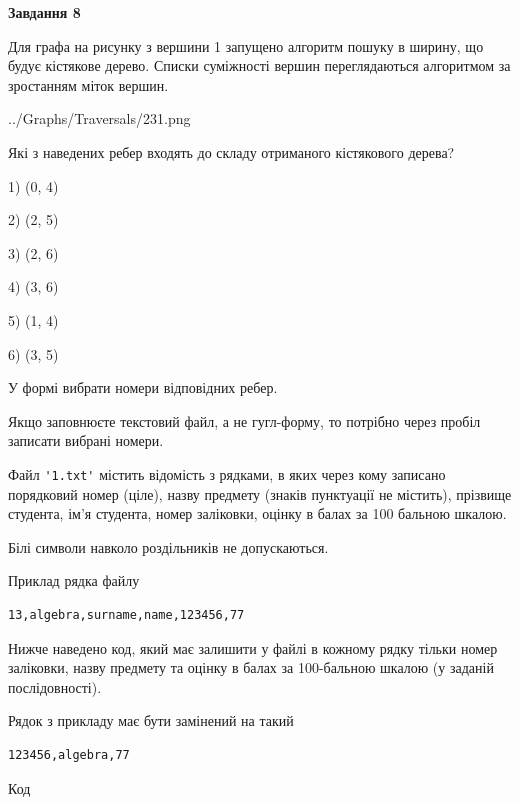 \documentclass[12pt, ukrainian]{article}
\def\code#1{\Verb!#1!}
\begin{document}
{\begin {large}
{\begin {center}\textbf{Завдання 8}\end {center}}\par
Для графа на рисунку з вершини 1 запущено алгоритм пошуку в ширину, що будує кістякове дерево. Списки суміжності вершин переглядаються алгоритмом за зростанням міток вершин.\par
\begin{center}
	{../Graphs/Traversals/231.png}
\end{center}
\par Які з наведених ребер входять до складу отриманого кістякового дерева?\par
1) (0, 4)\par
2) (2, 5)\par
3) (2, 6)\par
4) (3, 6)\par
5) (1, 4)\par
6) (3, 5)\par
{\vskip 15pt} У формі вибрати номери відповідних ребер.


Якщо заповнюєте текстовий файл, а не гугл-форму, то потрібно через пробіл записа\-ти вибрані номери.\par
\newpage


Файл \code{'1.txt'} містить відомість з рядками, в яких через кому записа\-но поряд\-ковий номер (ціле), назву предмету (знаків пунктуації не містить), прізвище студента, ім'я студента, номер заліковки, оцінку в балах за 100 бальною шкалою.

Білі символи навколо роздільників не допускаються.

Приклад рядка файлу



\begin{verbatim}
13,algebra,surname,name,123456,77
\end{verbatim}


Нижче наведено код, який має залишити у файлі в кожному рядку тільки номер заліковки, назву предмету та оцінку в балах за 100-бальною шкалою (у заданій послі\-дов\-ності).

Рядок з прикладу має бути замінений на такий



\begin{verbatim}
123456,algebra,77
\end{verbatim}




Код




\end{large}}
\end{document}
